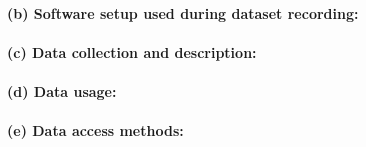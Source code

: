 \paragraph{(b) Software setup used during dataset recording:}
\paragraph{(c) Data collection and description:}
\paragraph{(d) Data usage:}
\paragraph{(e) Data access methods:}




